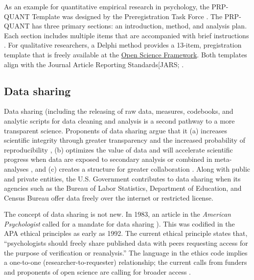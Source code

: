 \documentclass[
  11pt,
]{book}
\begin{document}
As an example for quantitative empirical research in psychology, the PRP-QUANT Template was designed by the Preregistration Task Force \citep{preregistration_task_force_preregistration_2021}. The PRP-QUANT has three primary sections: an introduction, method, and analysis plan. Each section includes multiple items that are accompanied with brief instructions \citep{bosnjak_template_2021}. For qualitative researchers, a Delphi method \citep{haven_preregistering_2020} provides a 13-item, pregistration template that is freely available at the \href{https://doi.org/10.31235/osf.io/pz9j}{Open Science Framework}. Both templates align with the Journal Article Reporting Standards{[}JARS; \citep{american_psychological_association_publication_2020}.

\subsection{Data sharing}\label{data-sharing}

Data sharing (including the releasing of raw data, measures, codebooks, and analytic scripts for data cleaning and analysis\citep{alter_responsible_2018} is a second pathway to a more transparent science. Proponents of data sharing argue that it (a) increases scientific integrity through greater transparency and the increased probability of reproducibility \citep{martone_data_2018}, (b) optimizes the value of data and will accelerate scientific progress when data are exposed to secondary analysis or combined in meta-analyses \citep{ross_ethical_2018}, and (c) creates a structure for greater collaboration \citep{bezjak_open_2018}. Along with public and private entities, the U.S. Government contributes to data sharing when its agencies such as the Bureau of Labor Statistics, Department of Education, and Census Bureau offer data freely over the internet or restricted license.

The concept of data sharing is not new. In 1983, an article in the \emph{American Psychologist} called for a mandate for data sharing \citep{ceci_private_1983}). This was codified in the APA ethical principles as early as 1992. The current ethical principle \citep{american_psychological_association_ethical_2017} states that, ``psychologists should freely share published data with peers requesting access for the purpose of verification or reanalysis.'' The language in the ethics code implies a one-to-one (researcher-to-requester) relationship; the current calls from funders and proponents of open science are calling for broader access \citep{martone_data_2018}.
\end{document}
